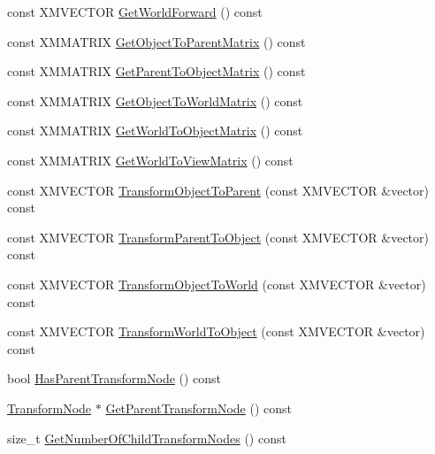 \begin{DoxyCompactItemize}
\item 
const X\+M\+V\+E\+C\+T\+OR \hyperlink{classmage_1_1_transform_node_a76dbfd8bb65478b3c72e257a67db9791}{Get\+World\+Forward} () const
\item 
const X\+M\+M\+A\+T\+R\+IX \hyperlink{classmage_1_1_transform_node_ae70e7e1ba6cf052397113a5ba90d5e98}{Get\+Object\+To\+Parent\+Matrix} () const
\item 
const X\+M\+M\+A\+T\+R\+IX \hyperlink{classmage_1_1_transform_node_afb6c8dba9ae69e19bed4400477c00e42}{Get\+Parent\+To\+Object\+Matrix} () const
\item 
const X\+M\+M\+A\+T\+R\+IX \hyperlink{classmage_1_1_transform_node_aa380b495bdf5ac30abe63c542175a60e}{Get\+Object\+To\+World\+Matrix} () const
\item 
const X\+M\+M\+A\+T\+R\+IX \hyperlink{classmage_1_1_transform_node_a20bb6f313308bee29893be0685c884f9}{Get\+World\+To\+Object\+Matrix} () const
\item 
const X\+M\+M\+A\+T\+R\+IX \hyperlink{classmage_1_1_transform_node_a79572d99dea625ee4e05247c0f645ba9}{Get\+World\+To\+View\+Matrix} () const
\item 
const X\+M\+V\+E\+C\+T\+OR \hyperlink{classmage_1_1_transform_node_a4307cdcb0d013550777cd77ec963a5d9}{Transform\+Object\+To\+Parent} (const X\+M\+V\+E\+C\+T\+OR \&vector) const
\item 
const X\+M\+V\+E\+C\+T\+OR \hyperlink{classmage_1_1_transform_node_adba5732ccaf2edcbd293ba509eb2ec35}{Transform\+Parent\+To\+Object} (const X\+M\+V\+E\+C\+T\+OR \&vector) const
\item 
const X\+M\+V\+E\+C\+T\+OR \hyperlink{classmage_1_1_transform_node_af147669a4717d79c98c249522f1e9192}{Transform\+Object\+To\+World} (const X\+M\+V\+E\+C\+T\+OR \&vector) const
\item 
const X\+M\+V\+E\+C\+T\+OR \hyperlink{classmage_1_1_transform_node_af35f0b8ed64dd065b03356a029497285}{Transform\+World\+To\+Object} (const X\+M\+V\+E\+C\+T\+OR \&vector) const
\item 
bool \hyperlink{classmage_1_1_transform_node_a3a2b75bf672e149dac54887f9e2552b3}{Has\+Parent\+Transform\+Node} () const
\item 
\hyperlink{classmage_1_1_transform_node}{Transform\+Node} $\ast$ \hyperlink{classmage_1_1_transform_node_a7b5d7e5de537827bbb74c161f4fd7d20}{Get\+Parent\+Transform\+Node} () const
\item 
size\+\_\+t \hyperlink{classmage_1_1_transform_node_af59a8f816e12adb2e3fd7277abf7691a}{Get\+Number\+Of\+Child\+Transform\+Nodes} () const

\end{DoxyCompactItemize}
